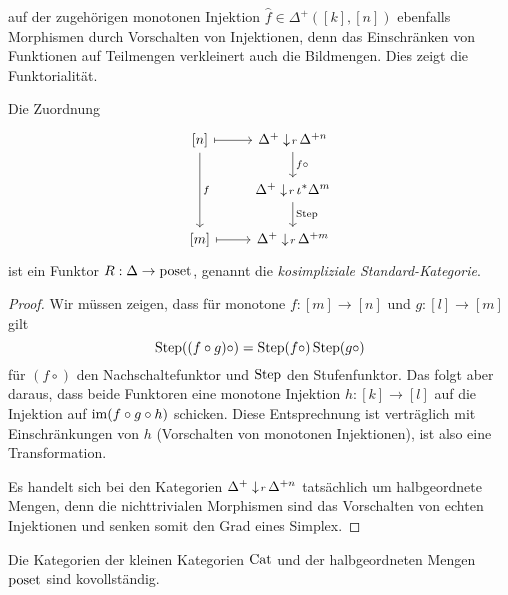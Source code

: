 auf der zugehörigen monotonen Injektion $\hat{f} \in \Delta^+([k],
[n])$ ebenfalls Morphismen durch Vorschalten von Injektionen, denn das
Einschränken von Funktionen auf Teilmengen verkleinert auch die
Bildmengen. Dies zeigt die Funktorialität.
\begin{prop}
  Die Zuordnung
  \[ \begin{tikzcd}
    {[n]} \arrow{dd}{f} \rar[mapsto]
    & \slicecat{\Delta^+}{r}{\Delta^{+n}} \dar{f \circ} \\
    & \slicecat{\Delta^+}{r}{\iota^* \Delta^m} \dar{\Step} \\
    {[m]} \rar[mapsto]
    & \slicecat{\Delta^+}{r}{\Delta^{+m}}
  \end{tikzcd} \]
  ist ein Funktor $R: \Delta \to \operatorname{poset}$, genannt die
  \emph{kosimpliziale Standard-Kategorie}.
\end{prop}
\begin{proof}
  Wir müssen zeigen, dass für monotone $f: [m] \to [n]$ und $g: [l]
  \to [m]$ gilt
  \[ \operatorname{Step} ((f \circ g)\circ) = \operatorname{Step} (f \circ) \operatorname{Step} (g \circ) \]
  für $(f \circ)$ den Nachschaltefunktor und $\operatorname{Step}$ den
  Stufenfunktor. Das folgt aber daraus, dass beide Funktoren eine
  monotone Injektion $h: [k] \to [l]$ auf die Injektion auf $\operatorname{im} (f
  \circ g \circ h)$ schicken. Diese Entsprechnung ist verträglich mit
  Einschränkungen von $h$ (Vorschalten von monotonen Injektionen), ist
  also eine Transformation.

  Es handelt sich bei den Kategorien
  $\Delta^+ \downarrow \! {\scriptstyle r} \, \Delta^{+n}$ tatsächlich um halbgeordnete
  Mengen, denn die nichttrivialen Morphismen sind das Vorschalten von
  echten Injektionen und senken somit den Grad eines Simplex.
\end{proof}
\begin{prop} \label{cat-cocomplete}
  Die Kategorien der kleinen Kategorien $\operatorname{Cat}$ und der halbgeordneten
  Mengen $\operatorname{poset}$ sind kovollständig.
\end{prop}
